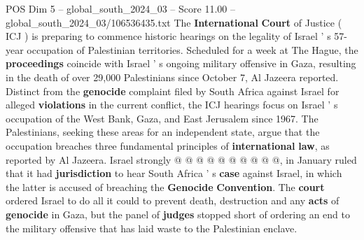 \begin{textsample}{POS Dim 5 – global\_south\_2024\_03 – Score 11.00 – global\_south\_2024\_03/106536435.txt}
The \textbf{International} \textbf{Court} of Justice ( ICJ ) is preparing to commence historic hearings on the legality of Israel ' s 57-year occupation of Palestinian territories.
Scheduled for a week at The Hague, the \textbf{proceedings} coincide with Israel ' s ongoing military offensive in Gaza, resulting in the death of over 29,000 Palestinians since October 7, Al Jazeera reported.
Distinct from the \textbf{genocide} complaint filed by South Africa against Israel for alleged \textbf{violations} in the current conflict, the ICJ hearings focus on Israel ' s occupation of the West Bank, Gaza, and East Jerusalem since 1967.
The Palestinians, seeking these areas for an independent state, argue that the occupation breaches three fundamental principles of \textbf{international} \textbf{law}, as reported by Al Jazeera.
Israel strongly @ @ @ @ @ @ @ @ @ @, in January ruled that it had \textbf{jurisdiction} to hear South Africa ' s \textbf{case} against Israel, in which the latter is accused of breaching the \textbf{Genocide} \textbf{Convention}.
The \textbf{court} ordered Israel to do all it could to prevent death, destruction and any \textbf{acts} of \textbf{genocide} in Gaza, but the panel of \textbf{judges} stopped short of ordering an end to the military offensive that has laid waste to the Palestinian enclave.

\end{textsample}
